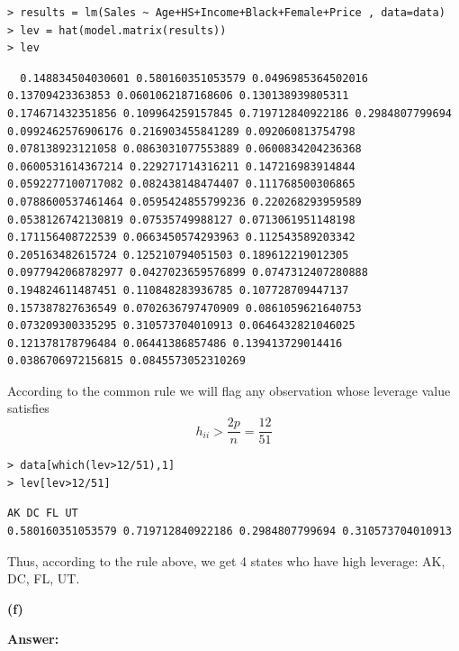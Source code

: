 \documentclass[letterpaper,11pt]{article}
\begin{document}
\begin{lstlisting}
> results = lm(Sales ~ Age+HS+Income+Black+Female+Price , data=data)
> lev = hat(model.matrix(results))
> lev
\end{lstlisting}

\begin{lstlisting}
  0.148834504030601 0.580160351053579 0.0496985364502016 0.13709423363853 0.0601062187168606 0.130138939805311 0.174671432351856 0.109964259157845 0.719712840922186 0.2984807799694 0.0992462576906176 0.216903455841289 0.092060813754798 0.078138923121058 0.0863031077553889 0.0600834204236368 0.0600531614367214 0.229271714316211 0.147216983914844 0.0592277100717082 0.082438148474407 0.111768500306865 0.0788600537461464 0.0595424855799236 0.220268293959589 0.0538126742130819 0.07535749988127 0.0713061951148198 0.171156408722539 0.0663450574293963 0.112543589203342 0.205163482615724 0.125210794051503 0.189612219012305 0.0977942068782977 0.0427023659576899 0.0747312407280888 0.194824611487451 0.110848283936785 0.107728709447137 0.157387827636549 0.0702636797470909 0.0861059621640753 0.073209300335295 0.310573704010913 0.0646432821046025 0.121378178796484 0.06441386857486 0.139413729014416 0.0386706972156815 0.0845573052310269
\end{lstlisting}

According to the common rule we will flag any observation whose leverage value satisfies
$$h_{ii} > \frac{2p}{n} = \frac{12}{51}$$

\begin{lstlisting}
> data[which(lev>12/51),1]
> lev[lev>12/51]
\end{lstlisting}

\begin{lstlisting}
AK DC FL UT
0.580160351053579 0.719712840922186 0.2984807799694 0.310573704010913
\end{lstlisting}

Thus, according to the rule above, we get 4 states who have high leverage: AK, DC, FL, UT.

\begin{addmargin}[-1.1em]{0em}
  \textbf{(f)}\par
\end{addmargin}
\textbf{}\par
\bigbreak
\begin{addmargin}[-0.5em]{0em}
  \textbf{Answer: }
\end{addmargin}
\end{document}
